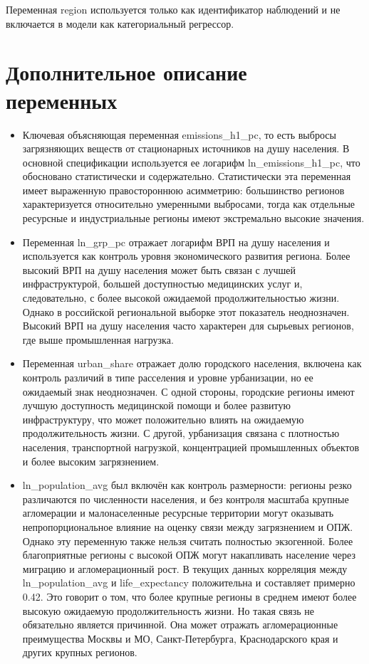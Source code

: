\documentclass[11pt,a4paper]{article}
\begin{document}
Переменная region используется только как идентификатор наблюдений и не включается в модели как категориальный регрессор.

\section*{Дополнительное описание переменных}
\begin{itemize}
\item Ключевая объясняющая переменная emissions\_h1\_pc, то есть выбросы загрязняющих веществ от стационарных источников на душу населения. В основной спецификации используется ее логарифм ln\_emissions\_h1\_pc, что обосновано статистически и содержательно. Статистически эта переменная имеет выраженную правостороннюю асимметрию: большинство регионов характеризуется относительно умеренными выбросами, тогда как отдельные ресурсные и индустриальные регионы имеют экстремально высокие значения.
\item Переменная ln\_grp\_pc отражает логарифм ВРП на душу населения и используется как контроль уровня экономического развития региона. Более высокий ВРП на душу населения может быть связан с лучшей инфраструктурой, большей доступностью медицинских услуг и, следовательно, с более высокой ожидаемой продолжительностью жизни. Однако в российской региональной выборке этот показатель неоднозначен. Высокий ВРП на душу населения часто характерен для сырьевых регионов, где выше промышленная нагрузка.
\item Переменная urban\_share отражает долю городского населения, включена как контроль различий в типе расселения и уровне урбанизации, но ее ожидаемый знак неоднозначен. С одной стороны, городские регионы имеют лучшую доступность медицинской помощи и более развитую инфраструктуру, что может положительно влиять на ожидаемую продолжительность жизни. С другой, урбанизация связана с плотностью населения, транспортной нагрузкой, концентрацией промышленных объектов и более высоким загрязнением.
\item ln\_population\_avg был включён как контроль размерности: регионы резко различаются по численности населения, и без контроля масштаба крупные агломерации и малонаселенные ресурсные территории могут оказывать непропорциональное влияние на оценку связи между загрязнением и ОПЖ. Однако эту переменную также нельзя считать полностью экзогенной. Более благоприятные регионы с высокой ОПЖ могут накапливать население через миграцию и агломерационный рост. В текущих данных корреляция между ln\_population\_avg и life\_expectancy положительна и составляет примерно 0.42. Это говорит о том, что более крупные регионы в среднем имеют более высокую ожидаемую продолжительность жизни. Но такая связь не обязательно является причинной. Она может отражать агломерационные преимущества Москвы и МО, Санкт-Петербурга, Краснодарского края и других крупных регионов.
\end{itemize}
\end{document}
